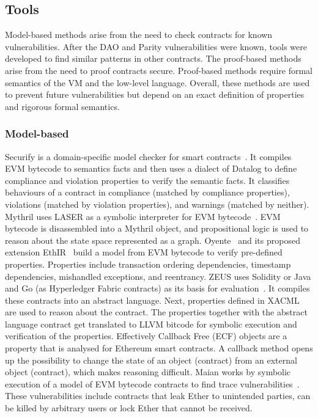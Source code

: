 


\subsection{Tools}
Model-based methods arise from the need to check contracts for known vulnerabilities. After the DAO and Parity vulnerabilities were known, tools were developed to find similar patterns in other contracts. The proof-based methods arise from the need to proof contracts secure. Proof-based methods require formal semantics of the VM and the low-level language. Overall, these methods are used to prevent future vulnerabilities but depend on an exact definition of properties and rigorous formal semantics.

\subsubsection{Model-based}
Securify is a domain-specific model checker for smart contracts~\cite{Tsankov2017}. It compiles EVM bytecode to semantics facts and then uses a dialect of Datalog to define compliance and violation properties to verify the semantic facts. It classifies behaviours of a contract in compliance (matched by compliance properties), violations (matched by violation properties), and warnings (matched by neither). 
Mythril uses LASER as a symbolic interpreter for EVM bytecode~\cite{Mueller2018}. EVM bytecode is disassembled into a Mythril object, and propositional logic is used to reason about the state space represented as a graph. 
Oyente~\cite{Luu2016} and its proposed extension EthIR~\cite{Albert2018} build a model from EVM bytecode to verify pre-defined properties. Properties include transaction ordering dependencies, timestamp dependencies, mishandled exceptions, and reentrancy.
ZEUS uses Solidity or Java and Go (as Hyperledger Fabric contracts) as its basis for evaluation~\cite{Kalra2018}. It compiles these contracts into an abstract language. Next, properties defined in XACML are used to reason about the contract. The properties together with the abstract language contract get translated to LLVM bitcode for symbolic execution and verification of the properties.
Effectively Callback Free (ECF) objects are a property that is analysed for Ethereum smart contracts\cite{Grossman2017}. A callback method opens up the possibility to change the state of an object (contract) from an external object (contract), which makes reasoning difficult. 
Maian works by symbolic execution of a model of EVM bytecode contracts to find trace vulnerabilities~\cite{Nikolic2018}. These vulnerabilities include contracts that leak Ether to unintended parties, can be killed by arbitrary users or lock Ether that cannot be received.

